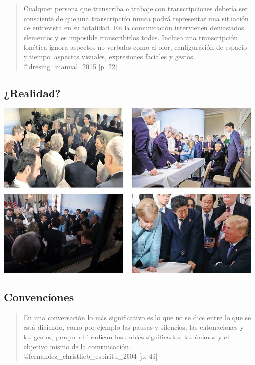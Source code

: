 \begin{quote}
Cualquier persona que transcriba o trabaje con transcripciones debería
ser consciente de que {una transcripción nunca podrá representar una
situación de entrevista en su totalidad}. En la comunicación intervienen
demasiados elementos y es imposible transcribirlos todos. Incluso una
transcripción fonética ignora aspectos no verbales como el olor,
configuración de espacio y tiempo, aspectos visuales, expresiones
faciales y gestos.\\
@dresing\_manual\_2015 {[}p. 22{]}
\end{quote}

\hypertarget{realidad}{%
\subsection{¿Realidad?}\label{realidad}}

\includegraphics{imagenes-cuali/merkel-trump-otros.jpg}

\hypertarget{convenciones}{%
\subsection{Convenciones}\label{convenciones}}

\begin{quote}
En una conversación {lo más significativo es lo que no se dice entre lo
que se está diciendo}, como por ejemplo las pausas y silencios, las
entonaciones y los gestos, porque ahí radican los dobles significados,
los ánimos y el objetivo mismo de la comunicación.\\
@fernandez\_christlieb\_espiritu\_2004 {[}p. 46{]}
\end{quote}

